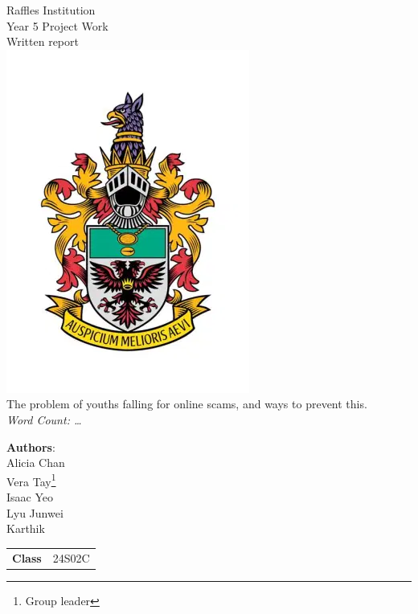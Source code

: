 \message{ !name(written-report.tex)}\documentclass[a4paper]{article}
\begin{document}

\begin{titlepage}
  \Centering{}
  \Large{Raffles Institution \\ Year 5 Project Work \\ Written report} \\
  \includegraphics[scale=0.5]{ri-school-crest.png} \\
  \huge{The problem of youths falling for online scams, and ways to prevent this.} \\
  \vspace{0.5cm}
  \small{\emph{Word Count: \ldots}} \\
  \vspace{0.5cm} \large{
    \textbf{Authors}: \\
    Alicia Chan \\
    Vera Tay\footnote{Group leader} \\
    Isaac Yeo \\
    Lyu Junwei \\
    Karthik \\
    \vspace{1cm}
    \begin{tabular}{r@{:}l}
      \textbf{Class} & \hspace{1cm} 24S02C \\
    \end{tabular}

  }
\end{titlepage}
\end{document}
